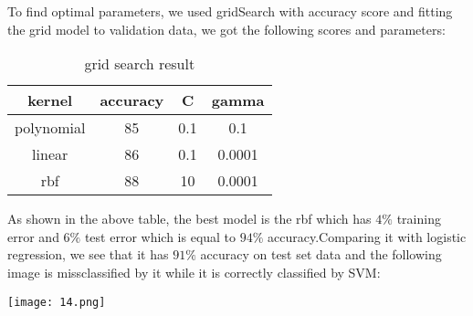 \documentclass{article}
\begin{document}
To find optimal parameters, we used gridSearch with accuracy score and fitting the grid model to validation data, we got the following scores and parameters:

\begin{table}[h!]
    \centering
    \begin{tabular}{|c|c|c|c|}
        \hline
        kernel &accuracy & C & gamma \\
        \hline
        polynomial & 85 & 0.1 & 0.1 \\
        \hline
        linear & 86 & 0.1 & 0.0001 \\
        \hline
        rbf & 88 & 10 & 0.0001 \\
        \hline
    \end{tabular}
    \caption{grid search result}
    \label{tab:my_table}
\end{table}

As shown in the above table, the best model is the rbf which has $4\%$ training error and $6\%$ test error which is equal to $94\%$ accuracy.Comparing it with logistic regression, we see that 
it has $91\%$ accuracy on test set data and the following image is missclassified by it while it is correctly classified by SVM:

\texttt{[image: 14.png]}
\end{document}
